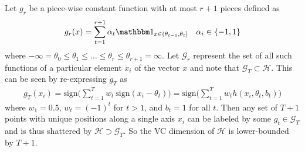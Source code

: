 \documentclass[11pt,letter]{article}
\begin{document}
\begin{enumerate}
Let $g_r$ be a piece-wise constant function with at most $r+1$ pieces defined as
\begin{align*}
    g_r(x)  = \sum_{t=1}^{r+1} \alpha_t \mathbbm 1_{x \in (\theta_{t-1},\theta_{t}]} \quad \alpha_i \in \{-1,1\}
\end{align*}
where $-\infty  = \theta_0 \le \theta_1 \le \dots \le \theta_r \le \theta_{r+1} = \infty$.
Let $\mathcal G_r$ represent the set of all such functions of a particular element $x_i$ of the vector $x$ and note that $\mathcal G_T \subset \mathcal H$.
This can be seen by re-expressing $g_T$ as
\begin{align*}
    g_T(x_i) = \text{sign}\big(\sum_{t=1}^{T} w_t \ \text{sign}(x_i - \theta_t)\big) = \text{sign}\big(\sum_{t=1}^T w_t h(x_i,\theta_t,b_t)\big)
\end{align*}
where $w_1 = 0.5$, $w_t = (-1)^t$ for $t > 1$, and $b_t = 1$ for all $t$.
Then any set of $T+1$ points with unique positions along a single axis $x_i$ can be labeled by some $g_t \in \mathcal G_T$ and is thus shattered by $\mathcal H \supset \mathcal G_T$.
So the VC dimension of $\mathcal H$ is lower-bounded by $T+1$.
\end{enumerate}
\end{document}
